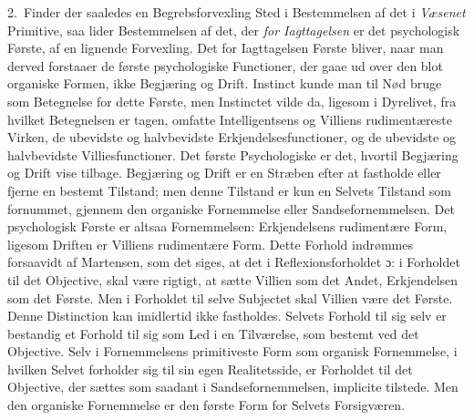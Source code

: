\documentclass[12pt,a4paper]{book}
\newcommand{\opage}[1]{\marginnote{\footnotesize\textit{[#1]}}}
\begin{document}
2.\ Finder der saaledes en Begrebsforvexling Sted i Be\opage{53}stemmelsen af det i
\emph{Væsenet} Primitive, saa lider Bestemmelsen af det, der \emph{for Iagttagelsen} er det psychologisk Første, af en lignende Forvexling. Det for Iagttagelsen Første
bliver, naar man derved forstaaer de første psychologiske Functioner, der gaae ud
over den blot organiske Formen, ikke Begjæring og Drift. Instinct kunde man til
Nød bruge som Betegnelse for dette Første, men Instinctet vilde da, ligesom i
Dyrelivet, fra hvilket Betegnelsen er tagen, omfatte Intelligentsens og Villiens
rudimentæreste Virken, de ubevidste og halvbevidste Erkjendelsesfunctioner, og de
ubevidste og halvbevidste Villiesfunctioner. Det første Psychologiske er det,
hvortil Begjæring og Drift vise tilbage. Begjæring og Drift er en Stræben efter at
fastholde eller fjerne en bestemt Tilstand; men denne Tilstand er kun en Selvets
Tilstand som fornummet, gjennem den organiske Fornemmelse eller Sandsefornemmelsen.
Det psychologisk Første er altsaa Fornemmelsen: Erkjendelsens rudimentære Form,
ligesom Driften er Villiens rudimentære Form. Dette Forhold indrømmes forsaavidt af
Martensen, som det siges, at det i Reflexionsforholdet ɔ: i Forholdet til det
Objective, skal være rigtigt, at sætte Villien som det Andet, Erkjendelsen som det
Første. Men i Forholdet til selve Subjectet skal Villien være det Første. Denne
Distinction kan imidlertid ikke fastholdes. Selvets Forhold til sig selv er
bestandig et Forhold til sig som Led i en Tilværelse, som bestemt ved det
Objective. Selv i Fornemmelsens primitiveste Form som organisk Fornemmelse, i
hvilken Selvet forholder sig til sin egen Realitetsside, er Forholdet til det
Objective, der sættes som saadant i Sandsefornemmelsen, implicite tilstede. Men
den organiske Fornemmelse er den første Form for Selvets Forsigværen.
\end{document}
